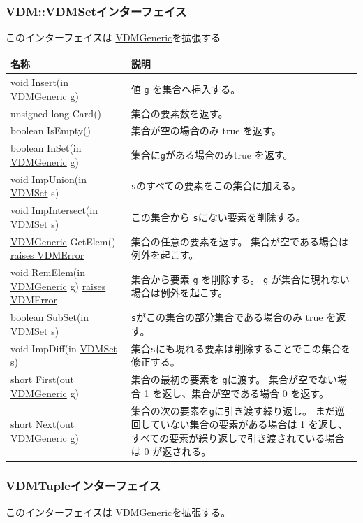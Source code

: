 \documentclass[\pformat,12pt]{jarticle}
\newcommand{\pbs}[1]{\let\temp=\\#1\let\\=\temp}
\newenvironment{interfacetable}{%
  \begin{longtable}{|>{\pbs\raggedright\ttfamily}p{6.6cm}%
                    |>{\pbs\raggedright}p{6.6cm}|} \hline
  \textrm{\bfseries 名称} &  \textbf{説明} \\ \hline
  \endhead
  }{\end{longtable}}
\newcommand{\VDMError}{\hyperlink{exception.VDMError}{raises VDMError}}
\newcommand{\VDMGeneric}{\hyperlink{interface.Generic}{VDMGeneric}}
\newcommand{\VDMSet}{\hyperlink{interface.VDMSet}{VDMSet}}
\begin{document}
\subsubsection{VDM::VDMSetインターフェイス}
\mbox{}
このインターフェイスは \hyperlink{interface.Generic}{VDMGeneric}を拡張する

\begin{interfacetable}
void Insert(in {\VDMGeneric} g)
 & 値 \texttt{g} を集合へ挿入する。
\\ \hline
unsigned long Card()
 & 集合の要素数を返す。
\\ \hline
boolean IsEmpty()
 & 集合が空の場合のみ true を返す。
\\ \hline
boolean InSet(in {\VDMGeneric} g)
 & 集合に\texttt{g}がある場合のみtrue を返す。
\\ \hline
void ImpUnion(in {\VDMSet} s)
 &  \texttt{s}のすべての要素をこの集合に加える。
\\ \hline
void ImpIntersect(in {\VDMSet} s)
 & この集合から \texttt{s}にない要素を削除する。
\\ \hline
{\VDMGeneric} GetElem() {\VDMError}
 & 集合の任意の要素を返す。
    集合が空である場合は例外を起こす。
\\ \hline
void RemElem(in {\VDMGeneric} g) {\VDMError}
 & 集合から要素 \texttt{g} を削除する。
     \texttt{g} が集合に現れない場合は例外を起こす。
\\ \hline
boolean SubSet(in {\VDMSet} s)
 & \texttt{s}がこの集合の部分集合である場合のみ true を返す。
\\ \hline
void ImpDiff(in {\VDMSet} s)
 & 集合\texttt{s}にも現れる要素は削除することでこの集合を修正する。
\\ \hline
short First(out {\VDMGeneric} g)
 & 集合の最初の要素を \texttt{g}に渡す。
   集合が空でない場合 1 を返し、集合が空である場合 0 を返す。
\\ \hline
short Next(out {\VDMGeneric} g)
 & 集合の次の要素を\texttt{g}に引き渡す繰り返し。
   まだ巡回していない集合の要素がある場合は 1 を返し、
    すべての要素が繰り返しで引き渡されている場合は 0 が返される。
\\ \hline
\end{interfacetable}

\subsubsection{VDMTupleインターフェイス}
\mbox{}
このインターフェイスは \hyperlink{interface.Generic}{VDMGeneric}を拡張する。
\end{document}
